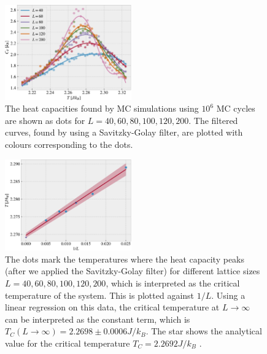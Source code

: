 \documentclass[%
 reprint,
nofootinbib,
aps,
]{revtex4-1}
\begin{document}
\begin{figure}
\includegraphics[width=0.485\textwidth]{../figures/fitted_suscept.pdf}
\caption{The heat capacities found by MC simulations using $10^6$ MC cycles are shown as dots for $L = 40, 60, 80, 100, 120, 200$. The filtered curves, found by using a Savitzky-Golay filter, are plotted with colours corresponding to the dots.}
\label{fig:fitted}
\end{figure}


\begin{figure}
\includegraphics[width=0.485\textwidth]{../figures/TC.pdf}
\caption{The dots mark the temperatures where the heat capacity peaks (after we applied the Savitzky-Golay filter) for different lattice sizes $L = 40, 60, 80, 100, 120, 200$, which is interpreted as the critical temperature of the system. This is plotted against $1/L$. Using a linear regression \cite{squires} on this data, the critical temperature at $L \to \infty$ can be interpreted as the constant term, which is $T_C(L\to\infty) = 2.2698 \pm  0.0006 J/k_B$. The star shows the analytical value for the critical temperature $T_C = 2.2692J/k_B$ \citep{onsager}.}
\label{fig:TC}
\end{figure}
\end{document}
